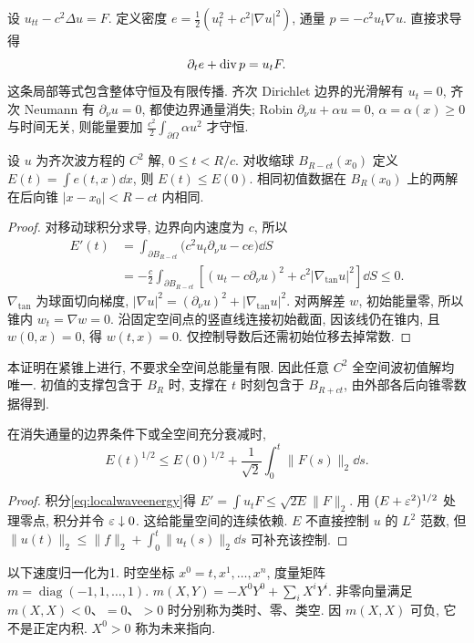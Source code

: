 \label{ch:energywave}
设 $u_{tt}-c^2\Delta u=F$. 定义密度 $e=\tfrac12(u_t^2+c^2|\nabla u|^2)$, 通量 $p=-c^2u_t\nabla u$. 直接求导得
\begin{equation}\label{eq:localwaveenergy}
\partial_te+\operatorname{div} p=u_tF.
\end{equation}
这条局部等式包含整体守恒及有限传播. 齐次 Dirichlet 边界的光滑解有 $u_t=0$, 齐次 Neumann 有 $\partial_\nu u=0$, 都使边界通量消失; Robin $\partial_\nu u+\alpha u=0$, $\alpha=\alpha(x)\ge0$ 与时间无关, 则能量要加 $\frac{c^2}2\int_{\partial\Omega}\alpha u^2$ 才守恒.
\begin{theorem}\label{thm:coneenergy}
设 $u$ 为齐次波方程的 $C^2$ 解, $0\le t<R/c$. 对收缩球 $B_{R-ct}(x_0)$ 定义 $E(t)=\int e(t,x)\dd x$, 则 $E(t)\le E(0)$. 相同初值数据在 $B_R(x_0)$ 上的两解在后向锥 $|x-x_0|<R-ct$ 内相同.
\end{theorem}
\begin{proof}
对移动球积分求导, 边界向内速度为 $c$, 所以
\begin{align*}
E'(t)&=\int_{\partial B_{R-ct}}\bigl(c^2u_t\partial_\nu u-ce\bigr)\dd S\\
&=-\frac c2\int_{\partial B_{R-ct}}
\left[(u_t-c\partial_\nu u)^2+c^2|\nabla_{\mathrm{tan}}u|^2\right]\dd S\le0.
\end{align*}
$\nabla_{\mathrm{tan}}$ 为球面切向梯度, $|\nabla u|^2=(\partial_\nu u)^2+|\nabla_{\mathrm{tan}}u|^2$. 对两解差 $w$, 初始能量零, 所以锥内 $w_t=\nabla w=0$. 沿固定空间点的竖直线连接初始截面, 因该线仍在锥内, 且 $w(0,x)=0$, 得 $w(t,x)=0$. 仅控制导数后还需初始位移去掉常数.
\end{proof}
本证明在紧锥上进行, 不要求全空间总能量有限. 因此任意 $C^2$ 全空间波初值解均唯一. 初值的支撑包含于 $B_R$ 时, 支撑在 $t$ 时刻包含于 $B_{R+ct}$, 由外部各后向锥零数据得到.
\begin{proposition}\label{prop:wavestability}
在消失通量的边界条件下或全空间充分衰减时,
\[
E(t)^{1/2}\le E(0)^{1/2}+\frac1{\sqrt2}\int_0^t\|F(s)\|_2\dd s.
\]
\end{proposition}
\begin{proof}
积分\eqref{eq:localwaveenergy}得 $E'=\int u_tF\le\sqrt{2E}\|F\|_2$. 用 $(E+\varepsilon^2)^{1/2}$ 处理零点, 积分并令 $\varepsilon\downarrow0$. 这给能量空间的连续依赖. $E$ 不直接控制 $u$ 的 $L^2$ 范数, 但 $\|u(t)\|_2\le\|f\|_2+\int_0^t\|u_t(s)\|_2\dd s$ 可补充该控制.
\end{proof}
以下速度归一化为1. 时空坐标 $x^0=t,x^1,\ldots,x^n$, 度量矩阵 $m=\operatorname{diag}(-1,1,\ldots,1)$. $m(X,Y)=-X^0Y^0+\sum_iX^iY^i$. 非零向量满足 $m(X,X)<0$、$=0$、$>0$ 时分别称为类时、零、类空. 因 $m(X,X)$ 可负, 它不是正定内积. $X^0>0$ 称为未来指向.

